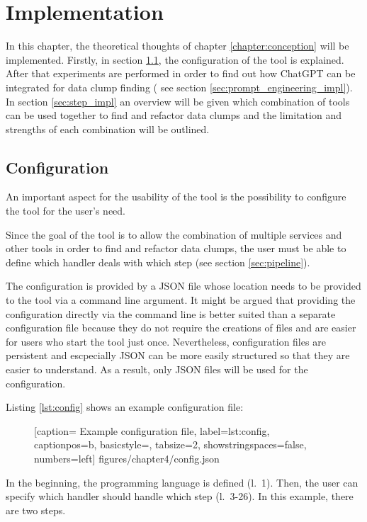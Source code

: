 
\begingroup
\renewcommand{\cleardoublepage}{} %
\renewcommand{\clearpage}{}
\chapter{Implementation}\label{chapter:implementation}
\endgroup
In this chapter, the theoretical thoughts of chapter \ref{chapter:conception} will be implemented. Firstly, in section \ref{sec:config}, the configuration of the tool is explained. After that experiments are performed in order to find out how ChatGPT can be integrated for data clump finding ( see section \ref{sec:prompt_engineering_impl}). In section \ref{sec:step_impl} an overview will be given which combination of tools can be used together to find and refactor data clumps and the limitation and strengths of each combination will be outlined. 
\section{Configuration}\label{sec:config}
An important aspect for the usability of the tool is the possibility to configure the tool for the user's need. 

Since the goal of the tool is to allow the combination of multiple services and other tools in order to find and refactor data clumps, the user must be able to define which handler deals with which step (see section \ref{sec:pipeline}).

The configuration is provided by a \ac{JSON} file whose location needs to be provided to the tool via a command line argument. It might be argued that providing the configuration directly via the command line is better suited than a separate configuration file because they do not require the creations of files and are easier for users who start the tool just once. Nevertheless, configuration files are persistent and escpecially \ac{JSON} can be more easily structured so that they are easier to understand. As a result, only \ac{JSON} files will be used  for the configuration. 


Listing \ref{lst:config} shows an example configuration file:
  \begin{figure} [htbp!]
			
			[caption={ Example configuration file},
			label={lst:config},
			captionpos=b, basicstyle=\footnotesize, tabsize=2, showstringspaces=false,  numbers=left]
			{figures/chapter4/config.json}
		\end{figure}


In the beginning, the programming language is defined (l.~1). Then, the user can specify which handler should handle which step (l.~3-26). In this example, there are two steps. 

